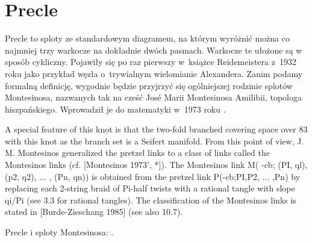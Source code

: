 \section{Precle}
%
%
Precle to sploty ze standardowym diagramem, na którym wyróżnić można co najmniej trzy warkocze na dokładnie dwóch pasmach.
Warkocze te ułożone są w sposób cykliczny.
Pojawiły się po raz pierwszy w~książce Reidemeistera z~1932 roku jako przykład węzła o~trywialnym wielomianie Alexandera.
Zanim podamy formalną definicję, wygodnie będzie przyjrzyć się ogólniejszej rodzinie splotów Montesinosa, nazwanych tak na cześć José Marii Montesinosa Amilibii, topologa hiszpańskiego.
Wprowadził je do matematyki w~1973 roku \cite{montesinos73}.

\begin{tobedone}
A special feature of this knot is that the two-fold branched covering space over 83 with this knot as the branch set is a Seifert manifold. From this point of view, J. M. Montesinos generalized the pretzel links to a class of links called the Montesinos links (cf. [Montesinos 1973', *]). The Montesinos link M( -cb; (PI, ql), (p2, q2), ... , (Pn, qn)) is obtained from the pretzel link P(-cb;PI,P2, ... ,Pn) by replacing each 2-string braid of Pi-half twists with a rational tangle with slope qi/Pi (see 3.3 for rational tangles). The classification of the Montesinos links is stated in [Burde-Zieschang 1985] (see also 10.7).
\end{tobedone}

\begin{tobedone}
    Precle i sploty Montesinosa: \cite[s. 27]{kawauchi96}.
\end{tobedone}

